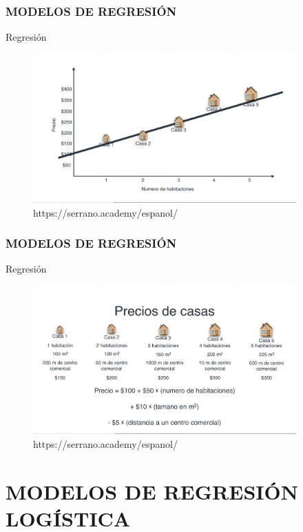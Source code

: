 \documentclass{beamer}
\begin{document}
\begin{frame}
	\frametitle{MODELOS DE REGRESIÓN}
\begin{block}{Regresión}	
		\begin{figure}
			\includegraphics[width=0.9\textwidth]{imagenes_regresion/IMG_3488.jpg}
			\caption{https://serrano.academy/espanol/}
		\end{figure}
	\end{block}
\end{frame}

\begin{frame}
	\frametitle{MODELOS DE REGRESIÓN}
\begin{block}{Regresión}	
		\begin{figure}
			\includegraphics[width=0.9\textwidth]{imagenes_regresion/IMG_3489.jpg}
			\caption{https://serrano.academy/espanol/}
		\end{figure}
	\end{block}
\end{frame}


\section{MODELOS DE REGRESIÓN LOGÍSTICA}
\end{document}
